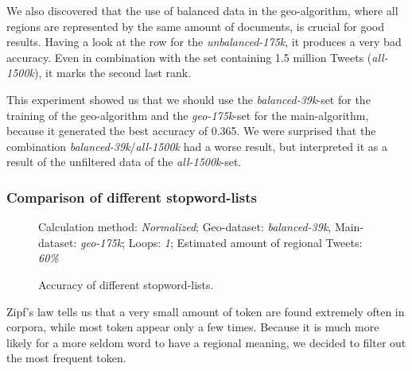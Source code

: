 \documentclass[../Main.tex]{subfiles}
\begin{document}
We also discovered that the use of balanced data in the geo-algorithm, where all regions are represented by the same amount of documents, is crucial for good results. Having a look at the row for the \emph{unbalanced-175k}, it produces a very bad accuracy. Even in combination with the set containing 1.5 million Tweets (\emph{all-1500k}), it marks the second last rank.

This experiment showed us that we should use the \emph{balanced-39k}-set for the training of the geo-algorithm and the \emph{geo-175k}-set for the main-algorithm, because it generated the best accuracy of 0.365. We were surprised that the combination \emph{balanced-39k}/\emph{all-1500k} had a worse result, but interpreted it as a result of the unfiltered data of the \emph{all-1500k}-set.

\subsubsection{Comparison of different stopword-lists}
\begin{figure}
\begin{center}
\end{center}
  \label{geo_graph1}
Calculation method: \textit{Normalized}; Geo-dataset: \textit{balanced-39k}, Main-dataset: \textit{geo-175k}; Loops: \textit{1}; Estimated amount of regional Tweets: \textit{60\%}
  \caption{Accuracy of different stopword-lists.}

\end{figure}

Zipf's law tells us that a very small amount of token are found extremely often in corpora, while most token appear only a few times. Because it is much more likely for a more seldom word to have a regional meaning, we decided to filter out the most frequent token. 
\end{document}
